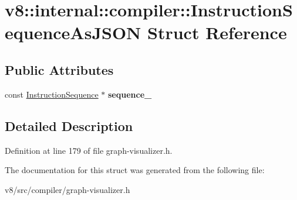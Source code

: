 \hypertarget{structv8_1_1internal_1_1compiler_1_1InstructionSequenceAsJSON}{}\section{v8\+:\+:internal\+:\+:compiler\+:\+:Instruction\+Sequence\+As\+J\+S\+ON Struct Reference}
\label{structv8_1_1internal_1_1compiler_1_1InstructionSequenceAsJSON}
\subsection*{Public Attributes}
\begin{DoxyCompactItemize}
\item 
\mbox{\label{structv8_1_1internal_1_1compiler_1_1InstructionSequenceAsJSON_ae88eeda128673053c83ab3258879519a}} 
const \mbox{\hyperlink{classv8_1_1internal_1_1compiler_1_1InstructionSequence}{Instruction\+Sequence}} $\ast$ {\bfseries sequence\+\_\+}
\end{DoxyCompactItemize}


\subsection{Detailed Description}


Definition at line 179 of file graph-\/visualizer.\+h.



The documentation for this struct was generated from the following file\+:\begin{DoxyCompactItemize}
\item 
v8/src/compiler/graph-\/visualizer.\+h\end{DoxyCompactItemize}
